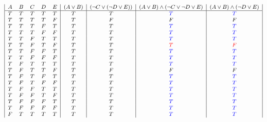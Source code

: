 \documentclass{article}
\begin{document}
\begin{enumerate}
        \begin{center}
            \begin{displaymath}
                {\footnotesize \begin{array}{|c c c c c|c|c|c|c|c|}
                A & B & C & D & E & (A \lor B) & (\neg C \lor (\neg D \lor E)) & (A \lor B) \land (\neg C \lor \neg D \lor E) & (A \lor B) \land (\neg D \lor E) \\
                \hline
                T & T & T & T & T & T & T & {\textcolor{blue}{T}} & {\textcolor{blue}{T}}\\
                T & T & T & T & F & T & F & F & F\\
                T & T & T & F & T & T & T & {\textcolor{blue}{T}} & {\textcolor{blue}{T}}\\
                T & T & T & F & F & T & T & {\textcolor{blue}{T}} & {\textcolor{blue}{T}}\\
                T & T & F & T & T & T & T & {\textcolor{blue}{T}} & {\textcolor{blue}{T}}\\
                T & T & F & T & F & T & T & {\textcolor{red}{T}} & \textcolor{red}{F}\\
                T & T & F & F & T & T & T & {\textcolor{blue}{T}} & {\textcolor{blue}{T}}\\
                T & T & F & F & F & T & T & {\textcolor{blue}{T}} & {\textcolor{blue}{T}}\\
                T & F & T & T & T & T & T & {\textcolor{blue}{T}} & {\textcolor{blue}{T}}\\        
                T & F & T & T & F & T & F & F & F\\
                T & F & T & F & T & T & T & {\textcolor{blue}{T}} & {\textcolor{blue}{T}}\\
                T & F & T & F & F & T & T & {\textcolor{blue}{T}} & {\textcolor{blue}{T}}\\
                T & F & F & T & T & T & T & {\textcolor{blue}{T}} & {\textcolor{blue}{T}}\\
                T & F & F & T & F & T & T & {\textcolor{blue}{T}} & {\textcolor{blue}{T}}\\
                T & F & F & F & T & T & T & {\textcolor{blue}{T}} & {\textcolor{blue}{T}}\\
                T & F & F & F & F & T & T & {\textcolor{blue}{T}} & {\textcolor{blue}{T}}\\
                F & T & T & T & T & T & T & {\textcolor{blue}{T}} & {\textcolor{blue}{T}}\\

\end{array}}
\end{displaymath}
\end{center}
\end{enumerate}
\end{document}
